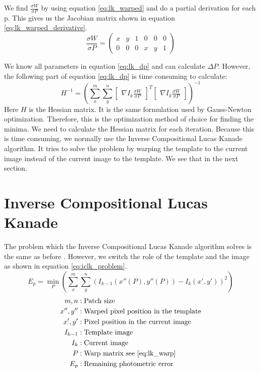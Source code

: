 \documentclass[11pt,a4paper,titlepage,oneside]{report}
\begin{document}
We find $\frac{\sigma W}{\sigma P}$ by using equation \ref{eq:lk_warped} and do a partial derivation for each p. This gives us the Jacobian matrix shown in equation \ref{eq:lk_warped_derivative}.
\begin{equation}\label{eq:lk_warped_derivative}
  \frac{\sigma W}{\sigma P}=
  \begin{pmatrix}
    x & y & 1 & 0 & 0 & 0 \\
    0 & 0 & 0 & x & y & 1
  \end{pmatrix}
\end{equation}

We know all parameters in equation \ref{eq:lk_dp} and can calculate $\Delta P$. However, the following part of equation \ref{eq:lk_dp} is time consuming to calculate:
\begin{equation}
  H^{-1}=(\sum_x^m\sum_y^n\begin{bmatrix}\nabla I_{k}\frac{\sigma W}{\sigma P}\end{bmatrix}^T\begin{bmatrix}\nabla I_{k}\frac{\sigma W}{\sigma P}\end{bmatrix})^{-1}
\end{equation}
Here $H$ is the Hessian matrix. It is the same formulation used by Gauss-Newton optimization. Therefore, this is the optimization method of choice for finding the minima. We need to calculate the Hessian matrix for each iteration. Because this is time consuming, we normally use the Inverse Compositional Lucas Kanade algorithm. It tries to solve the problem by warping the template to the current image instead of the current image to the template. We see that in the next section.

\section{Inverse Compositional Lucas Kanade}\label{sec:inv_comp_lk}
The problem which the Inverse Compositional Lucas Kanade algorithm solves is the same as before \cite{inverse_compositional}. However, we switch the role of the template and the image as shown in equation \ref{eq:iclk_problem}.
\begin{equation}\label{eq:iclk_problem}
  E_p=\min_P(\sum_x^m\sum_y^n(I_{k-1}(x''(P),y''(P))-I_{k}(x',y'))^2)
\end{equation}
\begin{align*}
  m,n        &: \text{Patch size}\\
  x'',y''    &: \text{Warped pixel position in the template}\\
  x',y'      &: \text{Pixel position in the current image}\\
  I_{k-1}    &: \text{Template image}\\
  I_{k}      &: \text{Current image}\\
  P          &: \text{Warp matrix see \ref{eq:lk_warp}}\\
  E_p        &: \text{Remaining photometric error}
\end{align*}
\end{document}
